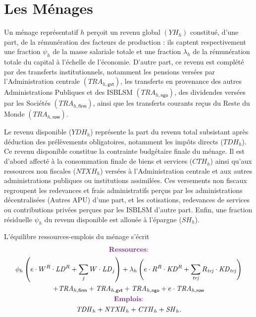 \documentclass[11pt,a4paper]{article}
\newcommand{\firm}{\mathsf{firm}}
\newcommand{\gvt}{\mathsf{gvt}}
\newcommand{\ngo}{\mathsf{ngo}}
\newcommand{\row}{\mathsf{row}}
\newcommand{\trj}{\mathit{trj}}
\newcommand{\CTH}{\mathit{CTH}}
\newcommand{\KD}{\mathit{KD}}
\newcommand{\LD}{\mathit{LD}}
\newcommand{\NTXH}{\mathit{NTXH}}
\newcommand{\SH}{\mathit{SH}}
\newcommand{\TDH}{\mathit{TDH}}
\newcommand{\TRA}{\mathit{TRA}}
\newcommand{\YDH}{\mathit{YDH}}
\newcommand{\YH}{\mathit{YH}}
\begin{document}
	\section{Les Ménages}
	
	Un ménage représentatif $h$ perçoit un revenu global $\left(\YH_h\right)$ constitué, d'une part, de la rémunération des facteurs de production : ils captent respectivement une fraction $\psi_h$ de la masse salariale totale et une fraction $\lambda_h$ de la rémunération totale du capital à l'échelle de l'économie. D'autre part, ce revenu est complété par des transferts institutionnels, notamment les pensions versées par l'Administration centrale $\left(\TRA_{h,\gvt}\right)$, les transferts en provenance des autres Administrations Publiques et des ISBLSM $\left(\TRA_{h,\ngo}\right)$, des dividendes versées par les Sociétés $\left(\TRA_{h,\firm}\right)$, ainsi que les transferts courants reçus du Reste du Monde $\left(\TRA_{h,\row}\right)$.
	
	Le revenu disponible ($\YDH_h$) représente la part du revenu total subsistant après déduction des prélèvements obligatoires, notamment les impôts directs ($\TDH_h$). Ce revenu disponible constitue la contrainte budgétaire finale du ménage. Il est d'abord affecté à la consommation finale de biens et services ($\CTH_h$) ainsi qu'aux ressources non fiscales ($\NTXH_h$) versées à l'Administration centrale et aux autres administrations publiques ou institutions assimilées. Ces versements non fiscaux regroupent les redevances et frais administratifs perçus par les administrations décentralisées (Autres APU) d'une part, et les cotisations, redevances de services ou contributions privées perçues par les ISBLSM d'autre part. Enfin, une fraction résiduelle $\psi_h$ du revenu disponible est allouée à l'épargne ($\SH_h$).
	
	L'équilibre ressources-emplois du ménage s'écrit	
	\begin{gather}
		\centerline{\textcolor{Fuchsia}{\textbf{Ressources}:}} \notag\\
		\phi_h \left(e\cdot W^R\cdot\LD^R + \sum_{j}^{}W\cdot \LD_j\right) + \lambda_h\left(e\cdot R^R\cdot\KD^R + \sum_{\trj}^{} R_{\trj}\cdot\KD_{\trj}\right) \notag\\
		+\TRA_{h,\firm} + \TRA_{h,\gvt} + \TRA_{h,\ngo} + e\cdot\TRA_{h,\row}\notag\\
		\centerline{\textcolor{Fuchsia}{\textbf{Emplois}:}} \notag\\
		\TDH_h + \NTXH_{h}  + \CTH_h + \SH_h. \notag
	\end{gather}
	
\end{document}
